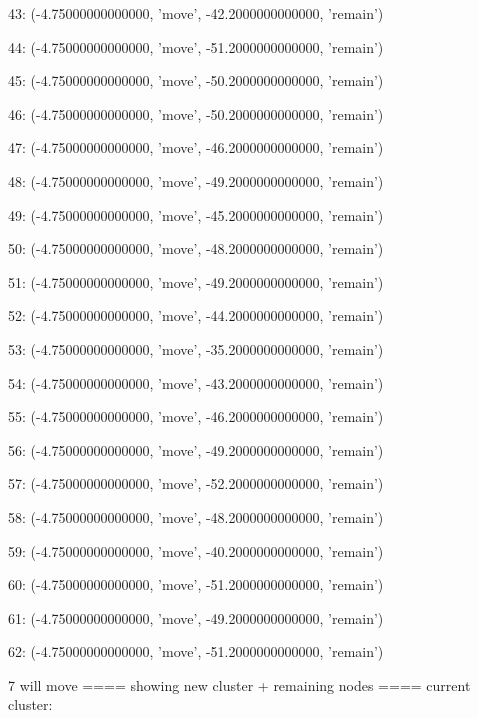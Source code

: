 43: (-4.75000000000000, 'move', -42.2000000000000, 'remain')


44: (-4.75000000000000, 'move', -51.2000000000000, 'remain')


45: (-4.75000000000000, 'move', -50.2000000000000, 'remain')


46: (-4.75000000000000, 'move', -50.2000000000000, 'remain')


47: (-4.75000000000000, 'move', -46.2000000000000, 'remain')


48: (-4.75000000000000, 'move', -49.2000000000000, 'remain')


49: (-4.75000000000000, 'move', -45.2000000000000, 'remain')


50: (-4.75000000000000, 'move', -48.2000000000000, 'remain')


51: (-4.75000000000000, 'move', -49.2000000000000, 'remain')


52: (-4.75000000000000, 'move', -44.2000000000000, 'remain')


53: (-4.75000000000000, 'move', -35.2000000000000, 'remain')


54: (-4.75000000000000, 'move', -43.2000000000000, 'remain')


55: (-4.75000000000000, 'move', -46.2000000000000, 'remain')


56: (-4.75000000000000, 'move', -49.2000000000000, 'remain')


57: (-4.75000000000000, 'move', -52.2000000000000, 'remain')


58: (-4.75000000000000, 'move', -48.2000000000000, 'remain')


59: (-4.75000000000000, 'move', -40.2000000000000, 'remain')


60: (-4.75000000000000, 'move', -51.2000000000000, 'remain')


61: (-4.75000000000000, 'move', -49.2000000000000, 'remain')


62: (-4.75000000000000, 'move', -51.2000000000000, 'remain')


7 will move
==== showing new cluster + remaining nodes ====
current cluster:


